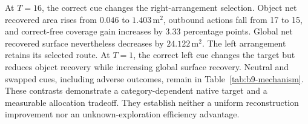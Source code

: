At $T=16$, the correct cue changes the right-arrangement selection. Object net recovered area rises from $0.046$ to $1.403$\,m$^2$, outbound actions fall from 17 to 15, and correct-free coverage gain increases by 3.33 percentage points. Global net recovered surface nevertheless decreases by $24.122$\,m$^2$. The left arrangement retains its selected route. At $T=1$, the correct left cue changes the target but reduces object recovery while increasing global surface recovery. Neutral and swapped cues, including adverse outcomes, remain in Table~\ref{tab:b9-mechanism}. These contrasts demonstrate a category-dependent native target and a measurable allocation tradeoff. They establish neither a uniform reconstruction improvement nor an unknown-exploration efficiency advantage.



